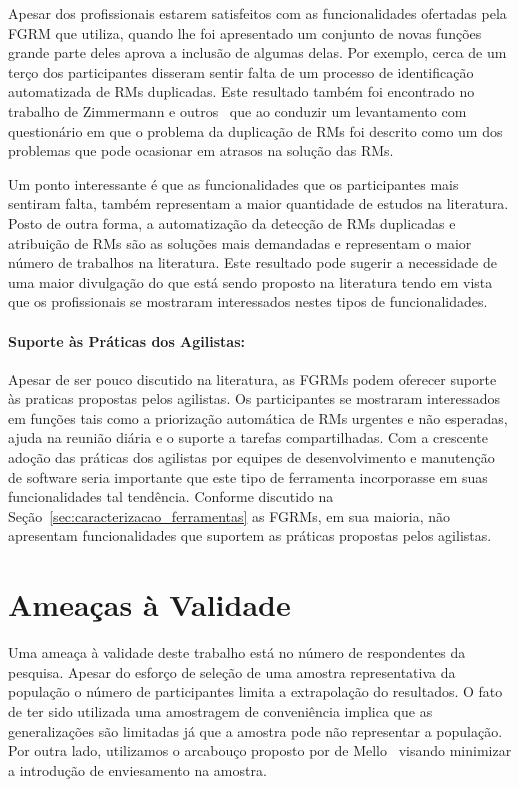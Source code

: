 Apesar dos profissionais estarem satisfeitos com as funcionalidades ofertadas
pela FGRM que utiliza, quando lhe foi apresentado um conjunto de novas funções
grande parte deles aprova a inclusão de algumas delas. Por exemplo, cerca de um
terço dos participantes disseram sentir falta de um processo de identificação
automatizada de RMs duplicadas. Este resultado também foi encontrado no
trabalho de Zimmermann e outros~\cite{zimmermann2010makes} que ao conduzir um
levantamento com questionário em que o problema da duplicação de RMs foi
descrito como um dos problemas que pode ocasionar em atrasos na solução das
RMs.

Um ponto interessante é que as funcionalidades que os participantes mais
sentiram falta, também representam a maior quantidade de estudos na literatura.
Posto de outra forma, a automatização da detecção de RMs duplicadas e
atribuição de RMs são as soluções mais demandadas e representam o maior número
de trabalhos na literatura. Este resultado pode sugerir a necessidade de uma
maior divulgação do que está sendo proposto na literatura tendo em vista que os
profissionais se mostraram interessados nestes tipos de funcionalidades.

\paragraph{Suporte às Práticas dos Agilistas:}\label{par:pesq_profissionais_suporte_pratica_agilistas}

Apesar de ser pouco discutido na literatura, as FGRMs podem oferecer suporte às
praticas propostas pelos agilistas. Os participantes se mostraram interessados
em funções tais como a priorização automática de RMs urgentes e não esperadas,
ajuda na reunião diária e o suporte a tarefas compartilhadas. Com a crescente
adoção das práticas dos agilistas por equipes de desenvolvimento e manutenção de
software seria importante que este tipo de ferramenta incorporasse em suas
funcionalidades tal tendência. Conforme discutido na
Seção~\ref{sec:caracterizacao_ferramentas} as FGRMs, em sua maioria, não
apresentam funcionalidades que suportem as práticas propostas pelos agilistas.

\section{Ameaças à Validade}\label{sec:pesquisa_profissionais_ameacas_validade}

Uma ameaça à validade deste trabalho está no número de respondentes da pesquisa.
Apesar do esforço de seleção de uma amostra representativa da população o número
de participantes limita a extrapolação do resultados. O fato de ter sido
utilizada uma amostragem de conveniência implica que as generalizações são
limitadas já que a amostra pode não representar a população. Por outra lado,
utilizamos o arcabouço proposto por de Mello~\cite{de2014towards} visando
minimizar a introdução de enviesamento na amostra.

